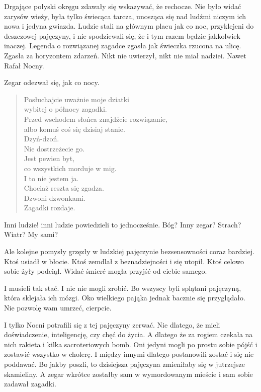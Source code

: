 Drgające połyski okręgu zdawały się wskazywać, że rechocze.
Nie było widać zarysów wieży, była tylko świecąca tarcza, unosząca się nad ludźmi niczym ich nowa i jedyna gwiazda.
Ludzie stali na głównym placu jak co noc, przyklejeni do deszczowej pajęczyny, i nie spodziewali się, że i tym razem będzie jakkolwiek inaczej.
Legenda o rozwiązanej zagadce zgasła jak świeczka rzucona na ulicę. Zgasła za horyzontem zdarzeń.
Nikt nie uwierzył, nikt nie miał nadziei.
Nawet Rafał Nocny.

Zegar odezwał się, jak co nocy.

\begin{sl}
\begin{quote}
Posłuchajcie uważnie moje dziatki \\
wybitej o północy zagadki. \\
Przed wschodem słońca znajdźcie rozwiązanie, \\
albo komuś coś się dzisiaj stanie. \\
Dzyń-dzoń. \\
Nie dostrzeżecie go. \\
Jest pewien byt, \\
co wszystkich morduje w mig. \\
I to nie jestem ja. \\
Chociaż reszta się zgadza. \\
Dzwoni dzwonkami. \\
Zagadki rozdaje. \\
\end{quote}
\end{sl}

\begin{dialogue}
	\ds{} Inni ludzie! \dm{} inni ludzie powiedzieli to jednocześnie.
	\ds{} Bóg?
	\ds{} Inny zegar?
	\ds{} Strach?
	\ds{} Wiatr?
	\ds{} My sami?
\end{dialogue}
Ale kolejne pomysły grzęzły w ludzkiej pajęczynie bezsensowności coraz bardziej.
Ktoś usiadł w błocie.
Ktoś zemdlał z beznadziejności i się utopił.
Ktoś celowo sobie żyły podciął.
Widać śmierć mogła przyjść od ciebie samego.

I musieli tak stać.
I nic nie mogli zrobić.
Bo wszyscy byli splątani pajęczyną, która sklejała ich mózgi.
Oko wielkiego pająka jednak bacznie się przyglądało.
Nie pozwolę wam umrzeć, cierpcie.

I tylko Nocni potrafili się z tej pajęczyny zerwać.
Nie dlatego, że mieli doświadczenie, inteligencję, czy chęć do życia.
A dlatego że za rogiem czekała na nich rakieta i kilka sacroteriowych bomb.
Oni jedyni mogli po prostu sobie pójść i zostawić wszystko w cholerę.
I między innymi dlatego postanowili zostać i się nie poddawać.
Bo jakby poszli, to dzisiejsza pajęczyna zmieniłaby się w jutrzejsze skamieliny.
A zegar wkrótce zostałby sam w wymordowanym mieście i sam sobie zadawał zagadki.

